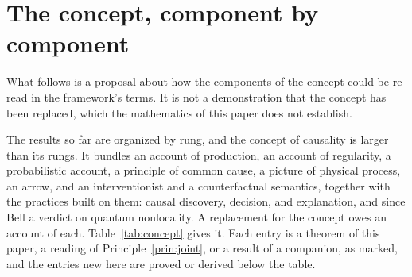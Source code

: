 \documentclass[11pt]{article}
\begin{document}
\section{The concept, component by component}
\label{sec:concept}

\noindent What follows is a proposal about how the components of the concept could be re-read in the framework's terms. It is not a demonstration that the concept has been replaced, which the mathematics of this paper does not establish.


The results so far are organized by rung, and the concept of causality is larger than its rungs. It bundles an account of production, an account of regularity, a probabilistic account, a principle of common cause, a picture of physical process, an arrow, and an interventionist and a counterfactual semantics, together with the practices built on them: causal discovery, decision, and explanation, and since Bell a verdict on quantum nonlocality. A replacement for the concept owes an account of each. Table~\ref{tab:concept} gives it. Each entry is a theorem of this paper, a reading of Principle~\ref{prin:joint}, or a result of a companion, as marked, and the entries new here are proved or derived below the table.
\end{document}
